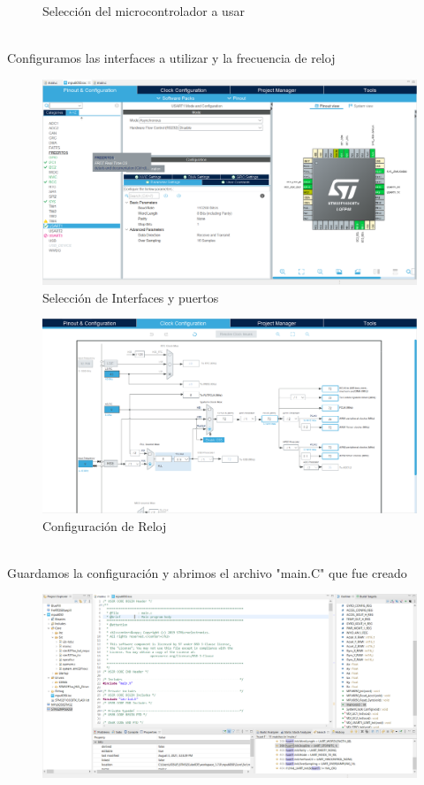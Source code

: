 \documentclass[12pt,oneside,spanish]{article}
\begin{document}
\begin{enumerate}
\begin{figure}[h!]
    \caption{Selección del microcontrolador a usar}
    \label{fig:my_label}
\end{figure}
\\
Configuramos las interfaces a utilizar y la frecuencia de reloj
\begin{figure}[h!]
    \centering
    \includegraphics[scale=0.4]{STM32CubeIDE/Configuracion.png}
    \caption{Selección de Interfaces y puertos}
    \label{fig:my_label}
\end{figure}
\begin{figure}[h!]
    \centering
    \includegraphics[scale=0.4]{STM32CubeIDE/Clock.png}
    \caption{Configuración de Reloj}
    \label{fig:my_label}
\end{figure}
\\
Guardamos la configuración y abrimos el archivo "main.C" que fue creado
\begin{figure}[h!]
    \centering
    \includegraphics[scale=0.4]{STM32CubeIDE/Ccode.png}

\end{figure}
\end{enumerate}
\end{document}

